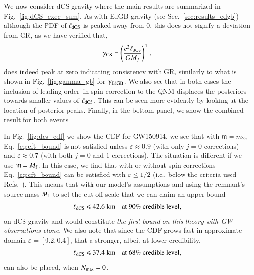 \documentclass[twocolumn,
               prd,
               aps,
               superscriptaddress,
               tightenlines,
               nofootinbib,
               eqsecnum,
               amsfonts,
               amsmath,
               longbibliography]{revtex4-1}
\newcommand{\gm}{\mathfrak{m}}
\newcommand{\agcomm}[1]{{\textcolor{red}{{[AG: #1]}}}}
\begin{document}
We now consider dCS gravity where the main results are summarized in Fig.~\ref{fig:dCS_exec_sum}.
%
As with EdGB gravity (see Sec.~\ref{sec:results_edgb}) although the PDF of $\ell_{\rm dCS}$
is peaked away from 0, this does not signify a deviation from GR, as we have verified that,
%
\begin{equation}
    \gamma_{\rm CS} = \left( \frac{c^2 \ell_{\rm dCS}}{G M_{f}} \right)^{4}\,,
\end{equation}
%
does indeed peak at zero indicating consistency with GR, similarly to what is
shown in Fig.~\ref{fig:gamma_gb} for $\gamma_{\rm EdGB}$.
%
We also see that in both cases the inclusion of leading-order--in-spin
correction to the QNM displaces the posteriors towards smaller values of
$\ell_{\rm dCS}$. This can be seen more evidently by looking at the location of
posterior peaks.
%
Finally, in the bottom panel, we show the combined result for both events.

In Fig.~\ref{fig:dcs_cdf} we show the CDF for GW150914, we see that with $\gm = m_2$,
Eq.~\eqref{eq:eft_bound} is not satisfied unless $\varepsilon \approx 0.9$ (with only $j=0$ corrections) and
$\varepsilon \approx 0.7$ (with both $j=0$ and $1$ corrections).
%
The situation is different if we use $\gm = M_{\rm f}$. In this case, we find that
with or without spin corrections Eq.~\eqref{eq:eft_bound} can be satisfied
with $\varepsilon \leqslant 1/2$ (i.e., below the criteria used
Refs.~\cite{Nair:2019iur,Perkins:2021mhb,Lyu:2022gdr}).
%
This means that with our model's assumptions and using the remnant's source mass $M_{\rm f}$ to set the
cut-off scale that we can claim an upper bound
%
\begin{equation}
\ell_{\rm dCS} \leqslant 42.6~\textrm{km}
\quad \textrm{at 90\% credible level},
\end{equation}
%
on dCS gravity and would constitute \emph{the first bound on this theory with GW
observations alone}.
%
We also note that since the CDF grows fast in approximate domain $\varepsilon = [0.2, 0.4]$,
that a stronger, albeit at lower credibility,
%
\begin{equation}
\ell_{\rm dCS} \leqslant 37.4~\textrm{km}
\quad \textrm{at 68\% credible level},
\end{equation}
%
can also be placed, when $N_{\rm max}=0$.
\end{document}

